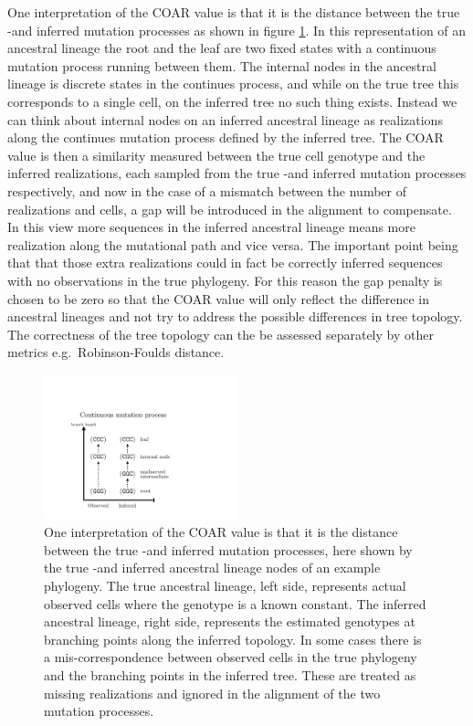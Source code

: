 One interpretation of the COAR value is that it is the distance between the true -and inferred mutation processes as shown in figure \ref{fig:mutation_process}.
In this representation of an ancestral lineage the root and the leaf are two fixed states with a continuous mutation process running between them.
The internal nodes in the ancestral lineage is discrete states in the continues process, and while on the true tree this corresponds to a single cell, on the inferred tree no such thing exists.
Instead we can think about internal nodes on an inferred ancestral lineage as realizations along the continues mutation process defined by the inferred tree.
The COAR value is then a similarity measured between the true cell genotype and the inferred realizations, each sampled from the true -and inferred mutation processes respectively, and now in the case of a mismatch between the number of realizations and cells, a gap will be introduced in the alignment to compensate.
In this view more sequences in the inferred ancestral lineage means more realization along the mutational path and vice versa.
The important point being that that those extra realizations could in fact be correctly inferred sequences with no observations in the true phylogeny.
For this reason the gap penalty is chosen to be zero so that the COAR value will only reflect the difference in ancestral lineages and not try to address the possible differences in tree topology.
The correctness of the tree topology can the be assessed separately by other metrics e.g.\ Robinson-Foulds distance.
\begin{figure}[ht!]
    \centering
    \includegraphics[width=0.5\textwidth]{figures/mutation_process2.pdf}
    \caption{
        \label{fig:mutation_process}
        One interpretation of the COAR value is that it is the distance between the true -and inferred mutation processes, here shown by the true -and inferred ancestral lineage nodes of an example phylogeny. The true ancestral lineage, left side, represents actual observed cells where the genotype is a known constant. The inferred ancestral lineage, right side, represents the estimated genotypes at branching points along the inferred topology. In some cases there is a mis-correspondence between observed cells in the true phylogeny and the branching points in the inferred tree. These are treated as missing realizations and ignored in the alignment of the two mutation processes.
    }
\end{figure}





